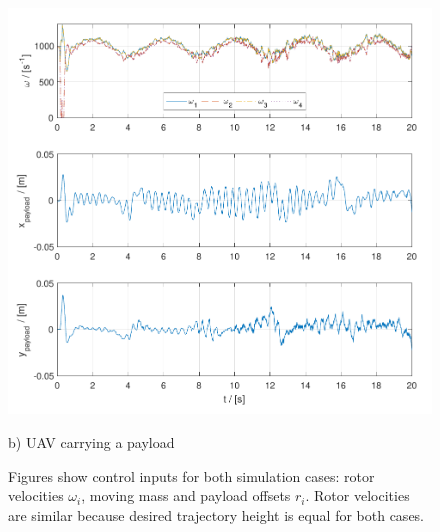 \begin{figure}
\begin{minipage}{0.5\columnwidth}
		\includegraphics[width=\columnwidth]{./pictures/mmuav_control_inputs.pdf}
		\caption*{b) UAV carrying a payload}
		\label{fig:mmuav_control}
	\end{minipage}
	\caption{Figures show control inputs for both simulation cases: rotor velocities $\omega_i$, moving mass and payload offsets $r_i$. Rotor velocities are similar because desired trajectory height is equal for both cases.}
\end{figure}


